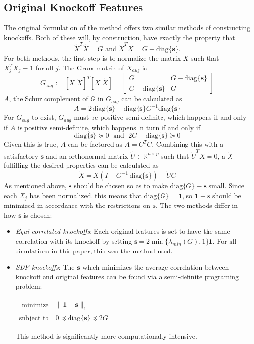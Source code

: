\documentclass[11pt]{article}
\newcommand{\R}{\mathbb{R}}
\newcommand{\diag}[1]{\mathrm{diag}\{#1\}}
\theoremstyle{definition}
\begin{document}
\subsection{Original Knockoff Features}
    The original formulation of the method offers two similar methods of constructing knockoffs. Both of these will, by construction, have exactly the property that
    \[ \tilde X^T\tilde X=G \textrm{ and } \tilde X^T X = G - \diag{\mathbf s}.\]
    For both methods, the first step is to normalize the matrix $X$ such that $X_j^TX_j=1$ for all $j$. The Gram matrix of $X_{aug}$ is
    \[ G_{aug}:= [X\; \tilde X]^T[X\; \tilde X] = \left[ \begin{array}{cc} G & G - \diag{\mathbf s} \\ G - \diag{\mathbf s} & G \end{array}\right] \]
    $A$, the Schur complement of $G$ in $G_{aug}$ can be calculated as 
    \[ A = 2\,\diag{\mathbf s} - \diag{\mathbf s}G^{-1}\diag{\mathbf s} \]
    For $G_{aug}$ to exist, $G_{aug}$ must be positive semi-definite, which happens if and only if $A$ is positive semi-definite, which happens in turn if and only if 
    \[ \diag{\mathbf s} \succeq 0  \; \textrm{ and } \; 2G - \diag{\mathbf s} \succeq 0 \]
    Given this is true, $A$ can be factored as $A=C^TC$. Combining this with a satisfactory $\mathbf s$ and an orthonormal matrix $\tilde U\in\R^{n\times p}$ such that $\tilde U^T X = 0$, a $\tilde X$ fulfilling the desired properties can be calculated as 
    \[ \tilde X = X(I-G^{-1}\,\diag{\mathbf s}) + \tilde UC\]
    As mentioned above, $\mathbf s$ should be chosen so as to make $\diag{G}-\mathbf s$ small. Since each $X_j$ has been normalized, this means that $\diag{G}=\mathbf 1$, so $\mathbf 1 - \mathbf s$ should be minimized in accordance with the restrictions on $\mathbf s$. The two methods differ in how $\mathbf s$ is chosen:
    \begin{itemize}
        \item \textit{Equi-correlated knockoffs}: Each original features is set to have the same correlation with its knockoff by setting $\mathbf s = 2\min\{\lambda_{min}(G),1\}\mathbf 1$. For all simulations in this paper, this was the method used.
        \item \textit{SDP knockoffs}: The $\mathbf s$ which minimizes the average correlation between knockoff and original features can be found via a semi-definite programing problem:
            \begin{center}
                \begin{tabular}{r l}
                    minimize & $\|\mathbf1-\mathbf s\|_1$ \\
                    subject to & $ 0 \preceq \diag{\mathbf s} \preceq 2G $
                \end{tabular} 
            \end{center}
            This method is significantly more computationally intensive. 
    \end{itemize}
     
\end{document}
